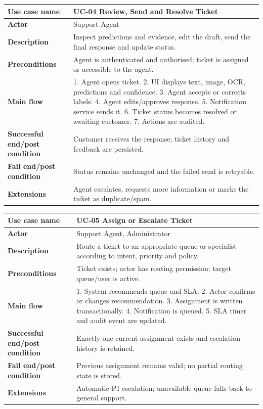 \documentclass[10pt,letterpaper]{article}
\newenvironment{ucase}[1]{%
\begin{table}[H]\centering\small
\begin{tabular}{|L{1.62in}|L{4.50in}|}\hline
\textbf{Use case name} & \textbf{#1}\\\hline}{%
\end{tabular}\end{table}}
\begin{document}
\begin{ucase}{UC-04 Review, Send and Resolve Ticket}
\textbf{Actor} & Support Agent\\\hline
\textbf{Description} & Inspect predictions and evidence, edit the draft, send the final response and update status.\\\hline
\textbf{Preconditions} & Agent is authenticated and authorised; ticket is assigned or accessible to the agent.\\\hline
\textbf{Main flow} & 1. Agent opens ticket. 2. UI displays text, image, OCR, predictions and confidence. 3. Agent accepts or corrects labels. 4. Agent edits/approves response. 5. Notification service sends it. 6. Ticket status becomes resolved or awaiting customer. 7. Actions are audited.\\\hline
\textbf{Successful end/post condition} & Customer receives the response; ticket history and feedback are persisted.\\\hline
\textbf{Fail end/post condition} & Status remains unchanged and the failed send is retryable.\\\hline
\textbf{Extensions} & Agent escalates, requests more information or marks the ticket as duplicate/spam.\\\hline
\end{ucase}

\begin{ucase}{UC-05 Assign or Escalate Ticket}
\textbf{Actor} & Support Agent, Administrator\\\hline
\textbf{Description} & Route a ticket to an appropriate queue or specialist according to intent, priority and policy.\\\hline
\textbf{Preconditions} & Ticket exists; actor has routing permission; target queue/user is active.\\\hline
\textbf{Main flow} & 1. System recommends queue and SLA. 2. Actor confirms or changes recommendation. 3. Assignment is written transactionally. 4. Notification is queued. 5. SLA timer and audit event are updated.\\\hline
\textbf{Successful end/post condition} & Exactly one current assignment exists and escalation history is retained.\\\hline
\textbf{Fail end/post condition} & Previous assignment remains valid; no partial routing state is stored.\\\hline
\textbf{Extensions} & Automatic P1 escalation; unavailable queue falls back to general support.\\\hline
\end{ucase}
\end{document}
